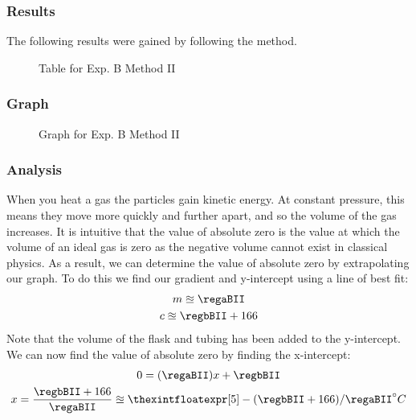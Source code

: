 \subsubsection{Results}
The following results were gained by following the method.
\begin{figure}[H]
  \centering
  \caption{Table for Exp. B Method II}
\end{figure}

\subsubsection{Graph}
\begin{figure}[H]
  \centering
  \caption{Graph for Exp. B Method II}
\end{figure}

\subsubsection{Analysis}
When you heat a gas the particles gain kinetic energy.
At constant pressure, this means they move more quickly and further apart, and so the volume of the gas increases.
It is intuitive that the value of absolute zero is the value at which the volume of an ideal gas is zero as the negative volume cannot exist in classical physics.
As a result, we can determine the value of absolute zero by extrapolating our graph.
To do this we find our gradient and y-intercept using a line of best fit:
\begin{gather*}
    m \approxeq \regaBII \\
    c \approxeq \regbBII + 166
\end{gather*}
Note that the volume of the flask and tubing has been added to the y-intercept. We can now find the value of absolute zero by finding the x-intercept:
\begin{gather*}
  0 =  (\regaBII)x+\regbBII \\
  x = \frac{\regbBII + 166}{\regaBII} \approxeq {\thexintfloatexpr [5] -(\regbBII+166)/\regaBII \relax} ^\circ C
\end{gather*}

